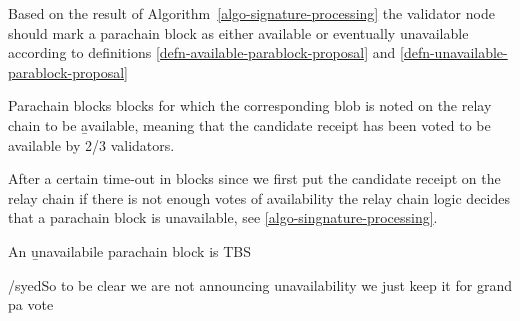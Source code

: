 Based on the result of Algorithm~\ref{algo-signature-processing} the validator node should mark a parachain block as either available or eventually unavailable according to definitions \ref{defn-available-parablock-proposal} and \ref{defn-unavailable-parablock-proposal}
\begin{definition}
  \label{defn-available-parablock-proposal}
        Parachain blocks blocks for which the corresponding blob is  noted on the relay chain to be {\b available}, meaning that the candidate receipt has been voted to be available by 2/3 validators.
\end{definition}

After a certain time-out in blocks since we first put the candidate receipt on the relay chain if there is not enough votes of availability the relay chain logic decides that a parachain block is unavailable, see \ref{algo-singnature-processing}.

\begin{definition}
  \label{defn-unavailable-parachain-block}
       An {\b unavailabile parachain block} is TBS
\end{definition}

/syed{}{So to be clear we are not announcing unavailability we just keep it for grand pa vote}

